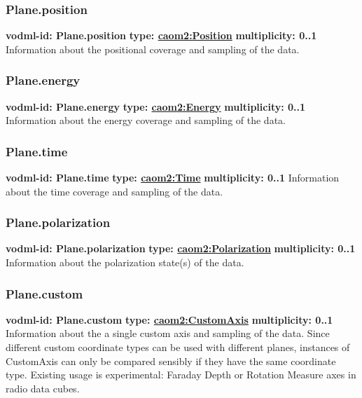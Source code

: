     \subsubsection{Plane.position}
      \textbf{vodml-id: Plane.position} \newline
      \textbf{type: \hyperref[sect:Position]{caom2:Position}} \newline
      \textbf{multiplicity: 0..1} \newline
      Information about the positional coverage and sampling of the data.

    \subsubsection{Plane.energy}
      \textbf{vodml-id: Plane.energy} \newline
      \textbf{type: \hyperref[sect:Energy]{caom2:Energy}} \newline
      \textbf{multiplicity: 0..1} \newline
      Information about the energy coverage and sampling of the data.

    \subsubsection{Plane.time}
      \textbf{vodml-id: Plane.time} \newline
      \textbf{type: \hyperref[sect:Time]{caom2:Time}} \newline
      \textbf{multiplicity: 0..1} \newline
      Information about the time coverage and sampling of the data.

    \subsubsection{Plane.polarization}
      \textbf{vodml-id: Plane.polarization} \newline
      \textbf{type: \hyperref[sect:Polarization]{caom2:Polarization}} \newline
      \textbf{multiplicity: 0..1} \newline
      Information about the polarization state(s) of the data.

    \subsubsection{Plane.custom}
      \textbf{vodml-id: Plane.custom} \newline
      \textbf{type: \hyperref[sect:CustomAxis]{caom2:CustomAxis}} \newline
      \textbf{multiplicity: 0..1} \newline
      Information about the a single custom axis and sampling of the data. Since different custom coordinate types can be used with different planes, instances of CustomAxis can only be compared sensibly if they have the same coordinate type. Existing usage is experimental: Faraday Depth or Rotation Measure axes in radio data cubes.

